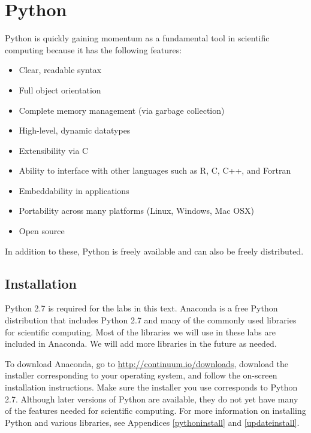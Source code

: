 \label{lab:Essential_Python}


\section*{Python}
Python is quickly gaining momentum as a fundamental tool in scientific computing because it has the following features:
\begin{itemize}
\item Clear, readable syntax
\item Full object orientation
\item Complete memory management (via garbage collection)
\item High-level, dynamic datatypes
\item Extensibility via C
\item Ability to interface with other languages such as R, C, C++, and Fortran
\item Embeddability in applications
\item Portability across many platforms (Linux, Windows, Mac OSX)
\item Open source
\end{itemize}
In addition to these, Python is freely available and can also be freely distributed.

\subsection*{Installation}
Python 2.7 is required for the labs in this text.
Anaconda is a free Python distribution that includes Python 2.7 and many of the commonly used libraries for scientific computing. 
Most of the libraries we will use in these labs are included in Anaconda.
We will add more libraries in the future as needed.

To download Anaconda, go to \url{http://continuum.io/downloads}, download the installer corresponding to your operating system, and follow the on-screen installation instructions. 
Make sure the installer you use corresponds to Python 2.7.
Although later versions of Python are available, they do not yet have many of the features needed for scientific computing. %
For more information on installing Python and various libraries, see Appendices \ref{pythoninstall} and \ref{updateinstall}.

